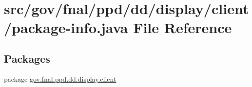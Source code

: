 \hypertarget{gov_2fnal_2ppd_2dd_2display_2client_2package-info_8java}{\section{src/gov/fnal/ppd/dd/display/client/package-\/info.java File Reference}
\label{gov_2fnal_2ppd_2dd_2display_2client_2package-info_8java}
}
\subsection*{Packages}
\begin{DoxyCompactItemize}
\item 
package \hyperlink{namespacegov_1_1fnal_1_1ppd_1_1dd_1_1display_1_1client}{gov.\-fnal.\-ppd.\-dd.\-display.\-client}
\end{DoxyCompactItemize}

